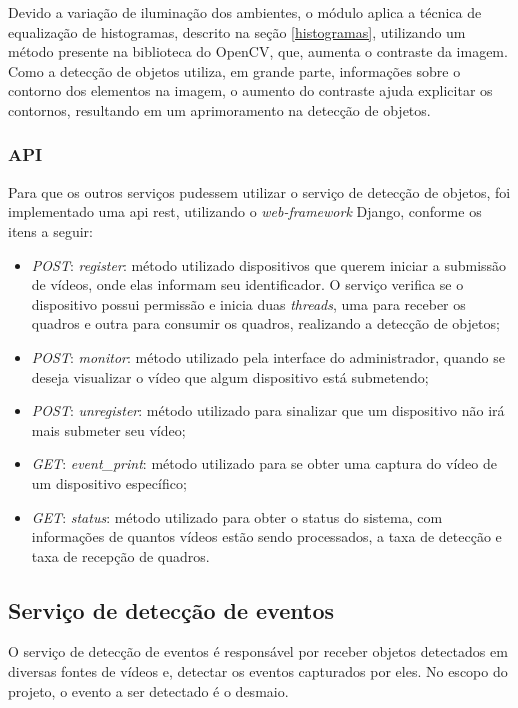 \documentclass[]{politex}
\begin{document}
Devido a variação de iluminação dos ambientes, o módulo aplica a técnica de equalização de histogramas, descrito na seção \ref{histogramas}, utilizando um método presente na biblioteca do OpenCV, que, aumenta o contraste da imagem. Como a detecção de objetos utiliza, em grande parte, informações sobre o contorno dos elementos na imagem, o aumento do contraste ajuda explicitar os contornos, resultando em um aprimoramento na detecção de objetos.

\subsubsection{API}
Para que os outros serviços pudessem utilizar o serviço de detecção de objetos, foi implementado uma \acrshort{api} \acrshort{rest}, utilizando o \textit{web-framework} Django, conforme os itens a seguir:
\begin{itemize}
    \item \textit{POST}: \textit{register}: método utilizado dispositivos que querem iniciar a submissão de vídeos, onde elas informam seu identificador. O serviço verifica se o dispositivo possui permissão e inicia duas \textit{threads}, uma para receber os quadros e outra para consumir os quadros, realizando a detecção de objetos;
    \item \textit{POST}: \textit{monitor}: método utilizado pela interface do administrador, quando se deseja visualizar o vídeo que algum dispositivo está submetendo;
    \item \textit{POST}: \textit{unregister}: método utilizado para sinalizar que um dispositivo não irá mais submeter seu vídeo;
    \item \textit{GET}: \textit{event\_print}: método utilizado para se obter uma captura do vídeo de um dispositivo específico;
    \item \textit{GET}: \textit{status}: método utilizado para obter o status do sistema, com informações de quantos vídeos estão sendo processados, a taxa de detecção e taxa de recepção de quadros.
\end{itemize}

\subsection{Serviço de detecção de eventos} 
O serviço de detecção de eventos é responsável por receber objetos detectados em diversas fontes de vídeos e, detectar os eventos capturados por eles. No escopo do projeto, o evento a ser detectado é o desmaio.
\end{document}
